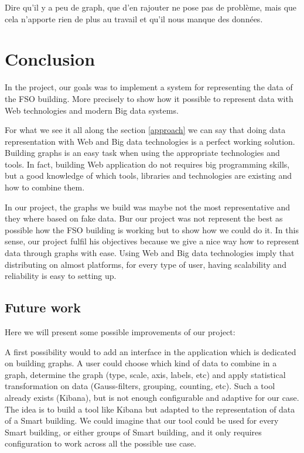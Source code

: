 \documentclass{acm_proc_article-sp}
\begin{document}
Dire qu'il y a peu de graph, que d'en rajouter ne pose pas de problème, mais que cela n'apporte rien de plus au travail et qu'il nous manque des données.
\section{Conclusion}
\label{conclusion}
In the project, our goals was to implement a system for representing the data of the FSO building. More precisely to show how it possible to represent data with Web technologies and modern Big data systems.

For what we see it all along the section \ref{approach} we can say that doing data representation with Web and Big data technologies is a perfect working solution. Building graphs is an easy task when using the appropriate technologies and tools. In fact, building Web application do not requires big programming skills, but a good knowledge of which tools, libraries and technologies are existing and how to combine them.

In our project, the graphs we build was maybe not the most representative and they where based on fake data. Bur our project was not represent the best as possible how the FSO building is working but to show how we could do it. In this sense, our project fulfil his objectives because we give a nice way how to represent data through graphs with ease. Using Web and Big data technologies imply that distributing on almost platforms, for every type of user, having scalability and reliability is easy to setting up.

\subsection{Future work}
\label{future_work}
Here we will present some possible improvements of our project:

A first possibility would to add an interface in the application which is dedicated on building graphs. A user could choose which kind of data to combine in a graph, determine the graph (type, scale, axis, labels, etc) and apply statistical transformation on data (Gauss-filters, grouping, counting, etc). Such a tool already exists (Kibana), but is not enough configurable and adaptive for our case. The idea is to build a tool like Kibana but adapted to the representation of data of a Smart building. We could imagine that our tool could be used for every Smart building, or either groups of Smart building, and it only requires configuration to work across all the possible use case.
\end{document}
